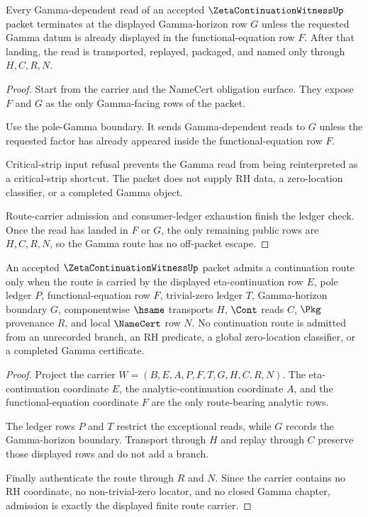 \begin{theorem}
\label{thm:zeta-continuation-witness-gamma-route-nonescape-ledger}
Every Gamma-dependent read of an accepted $\ZetaContinuationWitnessUp$ packet terminates at the displayed Gamma-horizon row $G$ unless the requested Gamma datum is already displayed in the functional-equation row $F$. After that landing, the read is transported, replayed, packaged, and named only through $H,C,R,N$.
\end{theorem}
\begin{proof}
Start from the carrier and the NameCert obligation surface. They expose $F$ and $G$ as the only Gamma-facing rows of the packet.

Use the pole-Gamma boundary. It sends Gamma-dependent reads to $G$ unless the requested factor has already appeared inside the functional-equation row $F$.

Critical-strip input refusal prevents the Gamma read from being reinterpreted as a critical-strip shortcut. The packet does not supply RH data, a zero-location classifier, or a completed Gamma object.

Route-carrier admission and consumer-ledger exhaustion finish the ledger check. Once the read has landed in $F$ or $G$, the only remaining public rows are $H,C,R,N$, so the Gamma route has no off-packet escape.
\end{proof}

\begin{theorem}
\label{thm:zeta-continuation-witness-route-carrier-admission}
An accepted $\ZetaContinuationWitnessUp$ packet admits a continuation route only when the route is carried by the displayed eta-continuation row $E$, pole ledger $P$, functional-equation row $F$, trivial-zero ledger $T$, Gamma-horizon boundary $G$, componentwise $\hsame$ transports $H$, $\Cont$ reads $C$, $\Pkg$ provenance $R$, and local $\NameCert$ row $N$. No continuation route is admitted from an unrecorded branch, an RH predicate, a global zero-location classifier, or a completed Gamma certificate.
\end{theorem}
\begin{proof}
Project the carrier $W=(B,E,A,P,F,T,G,H,C,R,N)$. The eta-continuation coordinate $E$, the analytic-continuation coordinate $A$, and the functional-equation coordinate $F$ are the only route-bearing analytic rows.

The ledger rows $P$ and $T$ restrict the exceptional reads, while $G$ records the Gamma-horizon boundary. Transport through $H$ and replay through $C$ preserve those displayed rows and do not add a branch.

Finally authenticate the route through $R$ and $N$. Since the carrier contains no RH coordinate, no non-trivial-zero locator, and no closed Gamma chapter, admission is exactly the displayed finite route carrier.
\end{proof}

